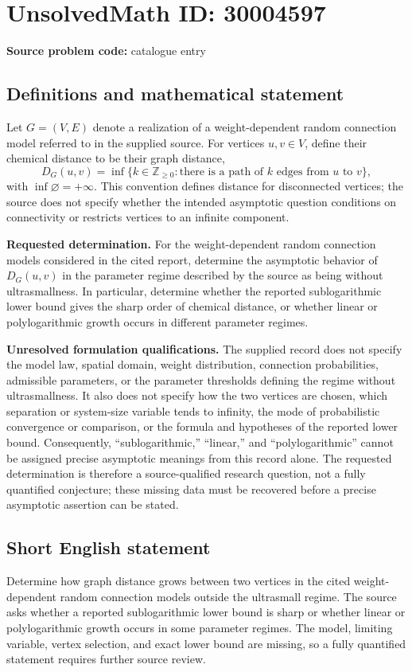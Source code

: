 \documentclass[11pt]{article}
\newcommand{\Z}{\mathbb{Z}}
\begin{document}
\section*{UnsolvedMath ID: 30004597}
\textbf{Source problem code:} catalogue entry
\subsection{Definitions and mathematical statement}
Let \(G=(V,E)\) denote a realization of a weight-dependent random connection model referred to in the supplied source. For vertices \(u,v\in V\), define their chemical distance to be their graph distance,
\[
D_G(u,v)=\inf\{k\in\Z_{\geq 0}:\text{there is a path of }k\text{ edges from }u\text{ to }v\},
\]
with \(\inf\varnothing=+\infty\). This convention defines distance for disconnected vertices; the source does not specify whether the intended asymptotic question conditions on connectivity or restricts vertices to an infinite component.

\textbf{Requested determination.} For the weight-dependent random connection models considered in the cited report, determine the asymptotic behavior of \(D_G(u,v)\) in the parameter regime described by the source as being without ultrasmallness. In particular, determine whether the reported sublogarithmic lower bound gives the sharp order of chemical distance, or whether linear or polylogarithmic growth occurs in different parameter regimes.

\textbf{Unresolved formulation qualifications.} The supplied record does not specify the model law, spatial domain, weight distribution, connection probabilities, admissible parameters, or the parameter thresholds defining the regime without ultrasmallness. It also does not specify how the two vertices are chosen, which separation or system-size variable tends to infinity, the mode of probabilistic convergence or comparison, or the formula and hypotheses of the reported lower bound. Consequently, ``sublogarithmic,'' ``linear,'' and ``polylogarithmic'' cannot be assigned precise asymptotic meanings from this record alone. The requested determination is therefore a source-qualified research question, not a fully quantified conjecture; these missing data must be recovered before a precise asymptotic assertion can be stated.
\subsection{Short English statement}
Determine how graph distance grows between two vertices in the cited weight-dependent random connection models outside the ultrasmall regime. The source asks whether a reported sublogarithmic lower bound is sharp or whether linear or polylogarithmic growth occurs in some parameter regimes. The model, limiting variable, vertex selection, and exact lower bound are missing, so a fully quantified statement requires further source review.
\end{document}
